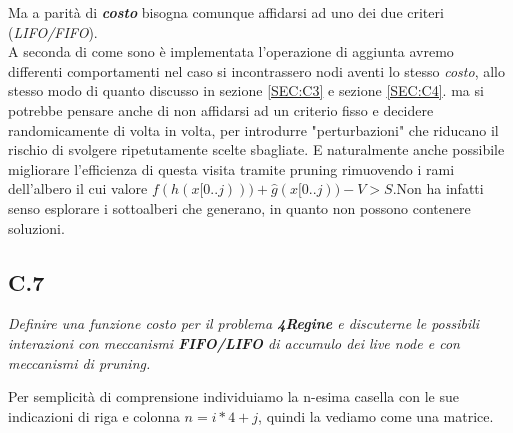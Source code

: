 \documentclass[a4paper]{article}
\newcommand{\imp}[1]{\textbf{\textit{#1}}}
\begin{document}
Ma a parità di \imp{costo} bisogna comunque affidarsi ad uno dei due criteri (\textit{LIFO/FIFO}).\\
A seconda di come sono è implementata l'operazione di aggiunta avremo differenti comportamenti nel caso si incontrassero nodi aventi lo stesso \textit{costo}, allo stesso modo di quanto discusso in sezione \ref{SEC:C3} e sezione \ref{SEC:C4}.
ma si potrebbe pensare anche di non affidarsi ad un criterio fisso e decidere randomicamente di volta in volta, per introdurre "perturbazioni" che riducano il rischio di svolgere ripetutamente scelte sbagliate.
E naturalmente anche possibile migliorare l'efficienza di questa visita tramite pruning rimuovendo i rami dell'albero il cui valore $ f(h(x[0..j))) + \hat g(x[0..j)) - V > S$.Non ha infatti senso esplorare i sottoalberi che generano, in quanto non possono contenere soluzioni.
\subsection{C.7}
\emph{Definire una funzione costo per il problema \textbf{4Regine} e discuterne le possibili interazioni con meccanismi \textbf{FIFO/LIFO} di accumulo dei live node e con meccanismi di pruning.}

Per semplicità di comprensione individuiamo la n-esima casella con le sue indicazioni di riga e colonna $n = i*4 + j$, quindi la vediamo come una matrice.
\end{document}

